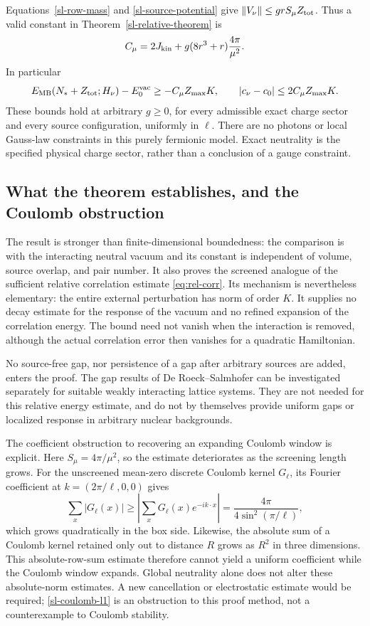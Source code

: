 Equations~\eqref{sl-row-mass} and \eqref{sl-source-potential} give
\(\|V_\nu\|\le grS_\mu Z_{\rm tot}\). Thus a valid constant in
Theorem~\ref{sl-relative-theorem} is
\begin{equation}
C_\mu=2J_{\rm kin}+g(8r^3+r)\frac{4\pi}{\mu^2}.
\label{sl-Cmu}
\end{equation}
In particular
\[
E_{\rm MB}(N_*+Z_{\rm tot};H_\nu)-E_0^{\rm vac}
\ge-C_\mu Z_{\max}K,
\qquad
|c_\nu-c_0|\le2C_\mu Z_{\max}K.
\]
These bounds hold at arbitrary \(g\ge0\), for every admissible exact
charge sector and every source configuration, uniformly in \(\ell\).
There are no photons or local Gauss-law constraints in this purely
fermionic model. Exact neutrality is the specified physical charge
sector, rather than a conclusion of a gauge constraint.

\subsection{What the theorem establishes, and the Coulomb obstruction}
\label{sl-scope}

The result is stronger than finite-dimensional boundedness: the
comparison is with the interacting neutral vacuum and its constant is
independent of volume, source overlap, and pair number. It also proves
the screened analogue of the sufficient relative correlation estimate
\eqref{eq:rel-corr}. Its mechanism is nevertheless elementary: the
entire external perturbation has norm of order \(K\). It supplies no
decay estimate for the response of the vacuum and no refined expansion
of the correlation energy. The bound need not vanish when the
interaction is removed, although the actual correlation error then
vanishes for a quadratic Hamiltonian.

No source-free gap, nor persistence of a gap after arbitrary sources
are added, enters the proof. The gap results of De Roeck--Salmhofer
\cite{DRS2019} can be investigated separately for suitable weakly
interacting lattice systems. They are not needed for this relative
energy estimate, and do not by themselves provide uniform gaps or
localized response in arbitrary nuclear backgrounds.

The coefficient obstruction to recovering an expanding Coulomb window
is explicit. Here \(S_\mu=4\pi/\mu^2\), so the estimate deteriorates
as the screening length grows. For the unscreened mean-zero discrete
Coulomb kernel \(G_\ell\), its Fourier coefficient at
\(k=(2\pi/\ell,0,0)\) gives
\begin{equation}
\sum_x|G_\ell(x)|
\ge\left|\sum_xG_\ell(x)e^{-ik\cdot x}\right|
=\frac{4\pi}{4\sin^2(\pi/\ell)},
\label{sl-coulomb-l1}
\end{equation}
which grows quadratically in the box side. Likewise, the absolute
sum of a Coulomb kernel retained only out to distance \(R\) grows
as \(R^2\) in three dimensions. This absolute-row-sum estimate
therefore cannot yield a uniform coefficient while the
Coulomb window expands. Global neutrality alone does not alter these
absolute-norm estimates. A new cancellation or electrostatic estimate
would be required; \eqref{sl-coulomb-l1} is an obstruction to this
proof method, not a counterexample to Coulomb stability.

